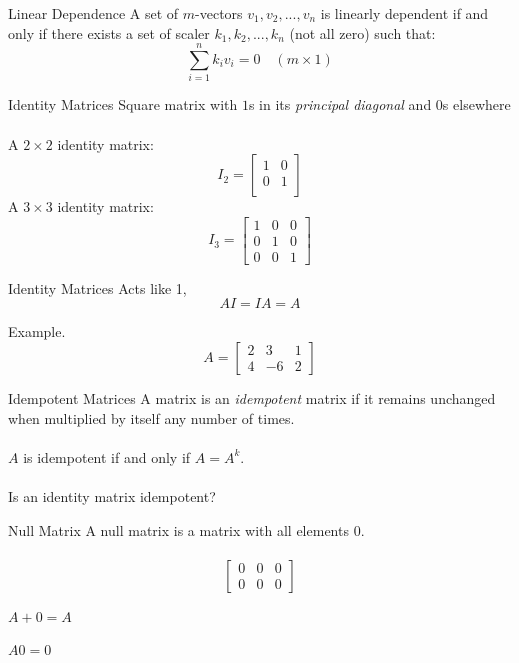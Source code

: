 \documentclass{./../../Latex/teaching_slides}
\begin{document}
\begin{frame}{Linear Dependence}
A set of $m$-vectors $v_1, v_2, ...,v_n$ is linearly dependent if and only if there exists a set of scaler $k_1, k_2, ..., k_n$ (not all zero) such that:
$$ \sum_{i=1}^n k_i v_i = 0 \quad (m \times 1) $$
\end{frame}

\begin{frame}{Identity Matrices}
Square matrix with $1$s in its \textit{principal diagonal} and $0$s elsewhere \\~\\
A $2 \times 2$ identity matrix:
$$ I_2 = \begin{bmatrix}
1 & 0\\
0 & 1 \\
\end{bmatrix}$$
A $3 \times 3$ identity matrix:
$$ I_3 = \begin{bmatrix}
1 & 0 & 0 \\
0 & 1 & 0\\
0 & 0 & 1
\end{bmatrix}$$

\end{frame}

\begin{frame}{Identity Matrices}
Acts like 1, 
$$ AI = IA = A $$

\vspace{2em}

Example. 
$$A = \begin{bmatrix}
2 & 3 & 1 \\
4 & -6 & 2
\end{bmatrix}$$
\end{frame}

\begin{frame}{Idempotent Matrices}
A matrix is an \textit{idempotent} matrix if it remains unchanged when multiplied by itself any number of times. \\~\\
$A$ is idempotent if and only if $A = A^k$. \\~\\
Is an identity matrix idempotent?
\end{frame}

\begin{frame}{Null Matrix}
A null matrix is a matrix with all elements $0$. \\~\\
$$\begin{bmatrix}
0 & 0 & 0 \\
0 & 0 & 0
\end{bmatrix}$$
\begin{witemize}
\item $A + 0 = A$
\item $A 0 = 0$
\end{witemize}
\end{frame}
\end{document}
